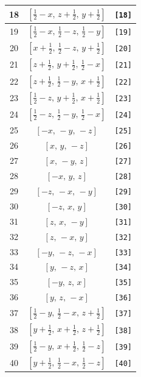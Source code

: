\documentclass[fleqn,8pt]{jsarticle}
\begin{document}
\begin{longtable}{ccc}
18 & $\left[ \frac{1}{2} - x,\, z + \frac{1}{2},\, y + \frac{1}{2} \right]$ & {\tt [18]} \\ \hline
19 & $\left[ \frac{1}{2} - x,\, \frac{1}{2} - z,\, \frac{1}{2} - y \right]$ & {\tt [19]} \\ \hline
20 & $\left[ x + \frac{1}{2},\, \frac{1}{2} - z,\, y + \frac{1}{2} \right]$ & {\tt [20]} \\ \hline
21 & $\left[ z + \frac{1}{2},\, y + \frac{1}{2},\, \frac{1}{2} - x \right]$ & {\tt [21]} \\ \hline
22 & $\left[ z + \frac{1}{2},\, \frac{1}{2} - y,\, x + \frac{1}{2} \right]$ & {\tt [22]} \\ \hline
23 & $\left[ \frac{1}{2} - z,\, y + \frac{1}{2},\, x + \frac{1}{2} \right]$ & {\tt [23]} \\ \hline
24 & $\left[ \frac{1}{2} - z,\, \frac{1}{2} - y,\, \frac{1}{2} - x \right]$ & {\tt [24]} \\ \hline
25 & $\left[ - x,\, - y,\, - z \right]$ & {\tt [25]} \\ \hline
26 & $\left[ x,\, y,\, - z \right]$ & {\tt [26]} \\ \hline
27 & $\left[ x,\, - y,\, z \right]$ & {\tt [27]} \\ \hline
28 & $\left[ - x,\, y,\, z \right]$ & {\tt [28]} \\ \hline
29 & $\left[ - z,\, - x,\, - y \right]$ & {\tt [29]} \\ \hline
30 & $\left[ - z,\, x,\, y \right]$ & {\tt [30]} \\ \hline
31 & $\left[ z,\, x,\, - y \right]$ & {\tt [31]} \\ \hline
32 & $\left[ z,\, - x,\, y \right]$ & {\tt [32]} \\ \hline
33 & $\left[ - y,\, - z,\, - x \right]$ & {\tt [33]} \\ \hline
34 & $\left[ y,\, - z,\, x \right]$ & {\tt [34]} \\ \hline
35 & $\left[ - y,\, z,\, x \right]$ & {\tt [35]} \\ \hline
36 & $\left[ y,\, z,\, - x \right]$ & {\tt [36]} \\ \hline
37 & $\left[ \frac{1}{2} - y,\, \frac{1}{2} - x,\, z + \frac{1}{2} \right]$ & {\tt [37]} \\ \hline
38 & $\left[ y + \frac{1}{2},\, x + \frac{1}{2},\, z + \frac{1}{2} \right]$ & {\tt [38]} \\ \hline
39 & $\left[ \frac{1}{2} - y,\, x + \frac{1}{2},\, \frac{1}{2} - z \right]$ & {\tt [39]} \\ \hline
40 & $\left[ y + \frac{1}{2},\, \frac{1}{2} - x,\, \frac{1}{2} - z \right]$ & {\tt [40]} \\ \hline

\end{longtable}
\end{document}
